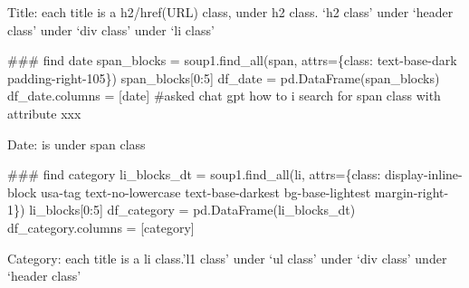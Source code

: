 \documentclass[
  letterpaper,
  DIV=11,
  numbers=noendperiod]{scrartcl}
\newenvironment{Shaded}{\begin{snugshade}}{\end{snugshade}}
\newcommand{\CommentTok}[1]{\textcolor[rgb]{0.37,0.37,0.37}{#1}}
\newcommand{\DecValTok}[1]{\textcolor[rgb]{0.68,0.00,0.00}{#1}}
\newcommand{\NormalTok}[1]{\textcolor[rgb]{0.00,0.23,0.31}{#1}}
\newcommand{\OperatorTok}[1]{\textcolor[rgb]{0.37,0.37,0.37}{#1}}
\newcommand{\StringTok}[1]{\textcolor[rgb]{0.13,0.47,0.30}{#1}}
\begin{document}
Title: each title is a h2/href(URL) class, under h2 class. `h2 class'
under `header class' under `div class' under `li class'

\begin{Shaded}
\begin{Highlighting}[]
\CommentTok{\#\#\# find date}
\NormalTok{span\_blocks }\OperatorTok{=}\NormalTok{ soup1.find\_all(}\StringTok{\textquotesingle{}span\textquotesingle{}}\NormalTok{, attrs}\OperatorTok{=}\NormalTok{\{}\StringTok{\textquotesingle{}class\textquotesingle{}}\NormalTok{: }\StringTok{\textquotesingle{}text{-}base{-}dark padding{-}right{-}105\textquotesingle{}}\NormalTok{\})}
\NormalTok{span\_blocks[}\DecValTok{0}\NormalTok{:}\DecValTok{5}\NormalTok{]}
\NormalTok{df\_date }\OperatorTok{=}\NormalTok{ pd.DataFrame(span\_blocks) }
\NormalTok{df\_date.columns }\OperatorTok{=}\NormalTok{ [}\StringTok{\textquotesingle{}date\textquotesingle{}}\NormalTok{]}
\CommentTok{\#asked chat gpt \textquotesingle{}how to i search for \textquotesingle{}span\textquotesingle{} class with attribute xxx\textquotesingle{}}
\end{Highlighting}
\end{Shaded}

Date: is under span class

\begin{Shaded}
\begin{Highlighting}[]
\CommentTok{\#\#\# find category}
\NormalTok{li\_blocks\_dt }\OperatorTok{=}\NormalTok{ soup1.find\_all(}\StringTok{\textquotesingle{}li\textquotesingle{}}\NormalTok{, attrs}\OperatorTok{=}\NormalTok{\{}\StringTok{\textquotesingle{}class\textquotesingle{}}\NormalTok{: }\StringTok{\textquotesingle{}display{-}inline{-}block usa{-}tag text{-}no{-}lowercase text{-}base{-}darkest bg{-}base{-}lightest margin{-}right{-}1\textquotesingle{}}\NormalTok{\})}
\NormalTok{li\_blocks[}\DecValTok{0}\NormalTok{:}\DecValTok{5}\NormalTok{]}
\NormalTok{df\_category }\OperatorTok{=}\NormalTok{ pd.DataFrame(li\_blocks\_dt)}
\NormalTok{df\_category.columns }\OperatorTok{=}\NormalTok{ [}\StringTok{\textquotesingle{}category\textquotesingle{}}\NormalTok{]}
\end{Highlighting}
\end{Shaded}

Category: each title is a li class.'l1 class' under `ul class' under
`div class' under `header class'
\end{document}
